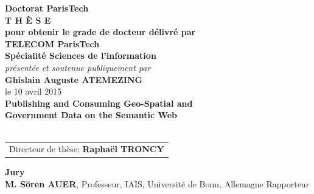 \begin{titlepage}
\begin{center}
%
\vspace{.5cm}
%
%
%
%
%
%
\vspace{1.0cm}
%
%
%
{\LARGE {\bf Doctorat ParisTech}}\\
\vspace{1.1cm}
{\LARGE {\bf T H \`{E} S E}}\\
\vspace{0.5cm}
{\normalsize {\bf pour obtenir le grade de docteur d\'{e}livr\'{e} par}}\\
%
%
%
\vspace{.9cm}
%
%
%
%
{\LARGE {\bf TELECOM ParisTech}}\\
\vspace{0.6cm}
{\Large {\bf Sp\'{e}cialit\'{e} \og Sciences de l'information \fg}}\\
%
%
%
\vspace{.8cm}
%
%
%
{\normalsize {\it pr\'{e}sent\'{e}e et soutenue publiquement par}}\\
\vspace{0.7cm}
{\Large {\bf Ghislain Auguste ATEMEZING}}\\
\vspace{0.24cm}
{\normalsize le 10 avril 2015}\\
%
%
%
\vfill
%
%
%
\textcolor[RGB]{191,18,56}{
\noindent
{\LARGE {\bf Publishing and Consuming Geo-Spatial and \\[.6cm]Government Data on the Semantic Web}}\\
}
%
%
\vfill~\vfill
%
%
%
{\normalsize
\begin{tabular}{c}
Directeur de th\`{e}se:					{\bf Rapha\"{e}l TRONCY}\\
\end{tabular}
}
\end{center}
%
%
%
\vfill
%
%
%
\flushleft
\begin{minipage}{.9\textwidth}	%
{\bf Jury}\\
{\bf M. Sören AUER}, {\small Professeur, IAIS, Universit\'{e} de Bonn, Allemagne}
	\hfill Rapporteur\\

\end{minipage}
\end{titlepage}
